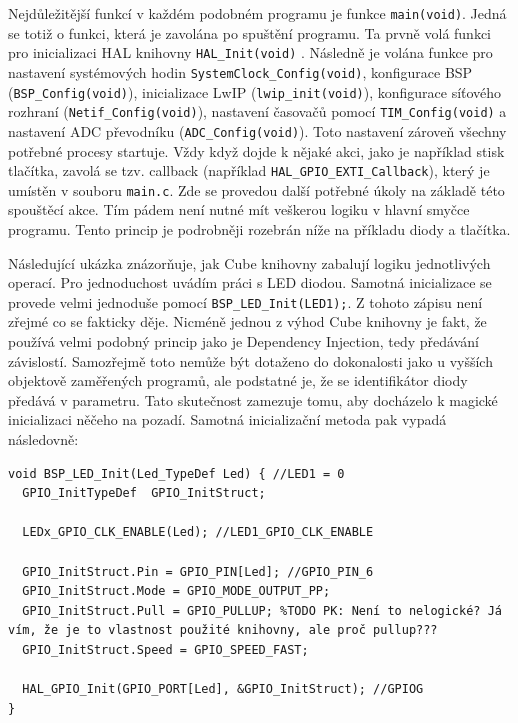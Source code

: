 Nejdůležitější funkcí v každém podobném programu je funkce \texttt{main(void)}. Jedná se totiž o funkci, která je zavolána po spuštění programu. Ta prvně volá funkci pro inicializaci HAL knihovny \texttt{HAL\_Init(void)} \cite{hal}. Následně je volána funkce pro nastavení systémových hodin \texttt{SystemClock\_Config(void)}, konfigurace BSP (\texttt{BSP\_Config(void)}), inicializace LwIP  (\texttt{lwip\_init(void)}), konfigurace síťového rozhraní (\texttt{Netif\_Config(void)}), nastavení časovačů pomocí \texttt{TIM\_Config(void)} a nastavení ADC převodníku (\texttt{ADC\_Config(void)}). Toto nastavení zároveň všechny potřebné procesy startuje. Vždy když dojde k nějaké akci, jako je například stisk tlačítka, zavolá se tzv. callback (například \texttt{HAL\_GPIO\_EXTI\_Callback}), který je umístěn v souboru \texttt{main.c}. Zde se provedou další potřebné úkoly na základě této spouštěcí akce. Tím pádem není nutné mít veškerou logiku v hlavní smyčce programu. Tento princip je podrobněji rozebrán níže na příkladu diody a tlačítka.

Následující ukázka znázorňuje, jak Cube knihovny  zabalují logiku jednotlivých operací. Pro jednoduchost uvádím práci s LED diodou. Samotná inicializace se provede velmi jednoduše pomocí \texttt{BSP\_LED\_Init(LED1);}. Z tohoto zápisu není zřejmé co se fakticky děje. Nicméně jednou z výhod Cube knihovny je fakt, že používá velmi podobný princip jako je Dependency Injection, tedy předávání závislostí. Samozřejmě toto nemůže být dotaženo do dokonalosti jako u vyšších objektově zaměřených programů, ale podstatné je, že se identifikátor diody předává v parametru. Tato skutečnost zamezuje tomu, aby docházelo k magické inicializaci něčeho na pozadí. Samotná inicializační metoda pak vypadá následovně:

\begin{verbatim}
void BSP_LED_Init(Led_TypeDef Led) { //LED1 = 0
  GPIO_InitTypeDef  GPIO_InitStruct;

  LEDx_GPIO_CLK_ENABLE(Led); //LED1_GPIO_CLK_ENABLE

  GPIO_InitStruct.Pin = GPIO_PIN[Led]; //GPIO_PIN_6
  GPIO_InitStruct.Mode = GPIO_MODE_OUTPUT_PP;
  GPIO_InitStruct.Pull = GPIO_PULLUP; %TODO PK: Není to nelogické? Já vím, že je to vlastnost použité knihovny, ale proč pullup???
  GPIO_InitStruct.Speed = GPIO_SPEED_FAST;
  
  HAL_GPIO_Init(GPIO_PORT[Led], &GPIO_InitStruct); //GPIOG
}
\end{verbatim}

